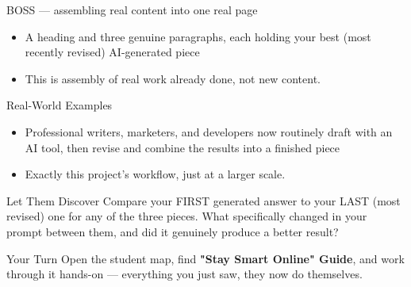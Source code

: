 \documentclass[aspectratio=169]{beamer}
\begin{document}
\begin{frame}{BOSS — assembling real content into one real page}
    \large
    \begin{itemize}
        \item A heading and three genuine paragraphs, each holding your best (most recently revised) AI-generated piece
        \item This is assembly of real work already done, not new content.
    \end{itemize}
\end{frame}

\begin{frame}{Real-World Examples}
    \large
    \begin{itemize}
        \item Professional writers, marketers, and developers now routinely draft with an AI tool, then revise and combine the results into a finished piece
        \item Exactly this project's workflow, just at a larger scale.
    \end{itemize}
\end{frame}


\begin{frame}{Let Them Discover}
    \Large
    Compare your FIRST generated answer to your LAST (most revised) one for any of the three pieces. What specifically changed in your prompt between them, and did it genuinely produce a better result?
\end{frame}

\begin{frame}{Your Turn}
    \Large
    Open the student map, find \textbf{"Stay Smart Online" Guide}, and work through it
    hands-on --- everything you just saw, they now do themselves.
\end{frame}
\end{document}
